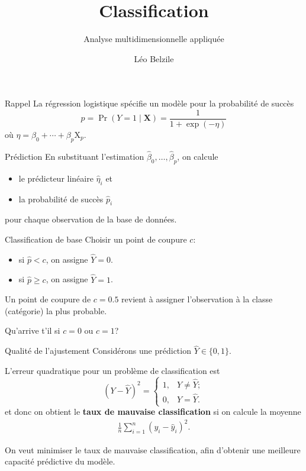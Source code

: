 \documentclass[
  ignorenonframetext,
]{beamer}
\title{Classification}
\subtitle{Analyse multidimensionnelle appliquée}
\author{Léo Belzile}
\date{}
\institute{HEC Montréal}
\providecommand{\tightlist}{%
  \setlength{\itemsep}{0pt}\setlength{\parskip}{0pt}}\usepackage{longtable,booktabs,array}
\begin{document}
\frame{\titlepage}


\begin{frame}{Rappel}
\label{rappel}
La régression logistique spécifie un modèle pour la probabilité de
succès \[p = \Pr(Y=1 \mid \mathbf{X}) = \frac{1}{1+\exp(-\eta)}\] où
\(\eta = \beta_0 + \cdots + \beta_p \mathrm{X}_p\).
\end{frame}

\begin{frame}{Prédiction}
\label{pruxe9diction}
En substituant l'estimation
\(\widehat{\beta}_0, \ldots, \widehat{\beta}_p\), on calcule

\begin{itemize}
\tightlist
\item
  le prédicteur linéaire \(\widehat{\eta}_i\) et
\item
  la probabilité de succès \(\widehat{p}_i\)
\end{itemize}

pour chaque observation de la base de données.
\end{frame}

\begin{frame}{Classification de base}
\label{classification-de-base}
Choisir un point de coupure \(c\):

\begin{itemize}
\tightlist
\item
  si \(\widehat{p} < c\), on assigne \(\widehat{Y}=0\).
\item
  si \(\widehat{p} \geq c\), on assigne \(\widehat{Y}=1\).
\end{itemize}

Un point de coupure de \(c=0.5\) revient à assigner l'observation à la
classe (catégorie) la plus probable.

Qu'arrive t'il si \(c=0\) ou \(c=1\)?
\end{frame}

\begin{frame}{Qualité de l'ajustement}
\label{qualituxe9-de-lajustement}
Considérons une prédiction \(\widehat{Y} \in \{0,1\}\).

L'erreur quadratique pour un problème de classification est
\[(Y-\widehat{Y})^2 = \begin{cases} 1, & Y \neq \widehat{Y}; \\0, & Y = \widehat{Y}.\end{cases}\]
et donc on obtient le \textbf{taux de mauvaise classification} si on
calcule la moyenne \begin{align*}
\frac{1}{n} \sum_{i=1}^n (y_i - \widehat{y}_i)^2.
\end{align*}

On veut minimiser le taux de mauvaise classification, afin d'obtenir une
meilleure capacité prédictive du modèle.
\end{frame}
\end{document}
